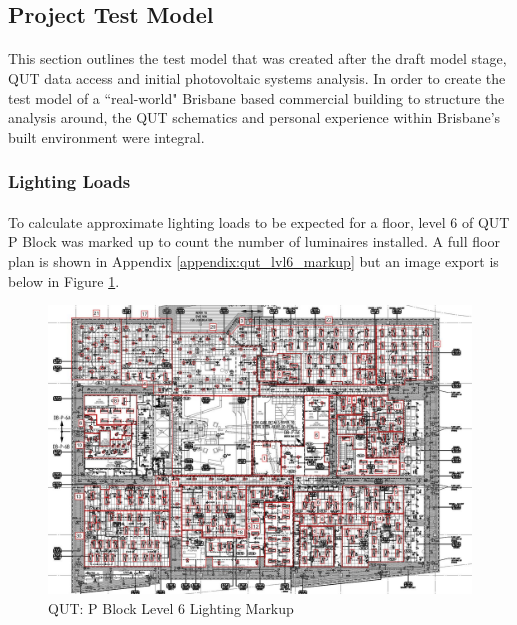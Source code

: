 
\subsection{Project Test Model} \label{section:project-model}

\paragraph{}
This section outlines the test model that was created after the draft model stage, QUT data access and initial photovoltaic systems analysis. In order to create the test model of a ``real-world" Brisbane based commercial building to structure the analysis around, the QUT schematics and personal experience within Brisbane's built environment were integral. 

\subsubsection{Lighting Loads}

\paragraph{}
To calculate approximate lighting loads to be expected for a floor, level 6 of QUT P Block was marked up to count the number of luminaires installed. A full floor plan is shown in Appendix \ref{appendix:qut_lvl6_markup} but an image export is below in Figure \ref{fig:qut-lvl6-lighting-markup}.      

\begin{figure}[H]
	\hfill\includegraphics[width = 150mm]{images/project-model/qut-lvl6-lighting-markup}\hspace*{\fill}
	\caption{QUT: P Block Level 6 Lighting Markup} 
	\label{fig:qut-lvl6-lighting-markup}
\end{figure}

